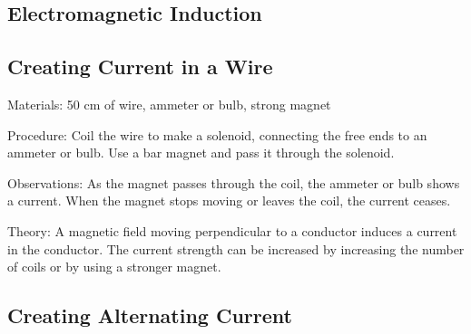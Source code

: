 \begin{multicols}{2}

\section*{Electromagnetic Induction}


\subsection{Creating Current in a Wire} %


\begin{description*}
\item[Materials:]{50 cm of wire, ammeter or bulb, strong magnet}
\item[Procedure:]{Coil the wire to make a solenoid, connecting the free ends to an ammeter or bulb. Use a bar magnet and pass it through the solenoid.}
\item[Observations:]{As the magnet passes through the coil, the ammeter or bulb shows a current. When the magnet stops moving or leaves the coil, the current ceases.}
\item[Theory:]{A magnetic field moving perpendicular to a conductor induces a current in the conductor. The current strength can be increased by increasing the number of coils or by using a stronger magnet.}
\end{description*}

\subsection{Creating Alternating Current} 



\end{multicols}
